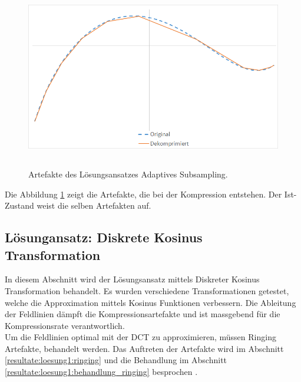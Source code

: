 \begin{figure}[!htbp]
	\center
	\includegraphics[width=1\textwidth,height=8cm,keepaspectratio]{./pictures/resultate/loesung0/loesung0_artefakte.png}
	\caption{Artefakte des Lösungsansatzes Adaptives Subsampling.}
	\label{resultate:loesung0:artefakte}
\end{figure}
Die Abbildung \ref{resultate:loesung0:artefakte} zeigt die Artefakte, die bei der Kompression entstehen. Der Ist-Zustand weist die selben Artefakten auf.
\pagebreak

\subsection{Lösungansatz: Diskrete Kosinus Transformation}
In diesem Abschnitt wird der Lösungsansatz mittels Diskreter Kosinus Transformation behandelt. Es wurden verschiedene Transformationen getestet, welche die Approximation mittels Kosinus Funktionen verbessern. Die Ableitung der Feldlinien dämpft die Kompressionsartefakte und ist massgebend für die Kompressionsrate verantwortlich.\\
Um die Feldlinien optimal mit der DCT zu approximieren, müssen Ringing Artefakte, behandelt werden. Das Auftreten der Artefakte wird im Abschnitt \ref{resultate:loesung1:ringing} und die Behandlung im Abschnitt \ref{resultate:loesung1:behandlung_ringing} besprochen .

